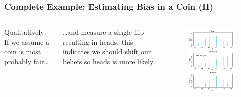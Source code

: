 \documentclass[usenames,dvipsnames,table]{beamer}
\begin{document}
\begin{frame}
\frametitle{Complete Example: Estimating Bias in a Coin (II)}
\begin{columns}[c]
Qualitatively: If we assume a coin is most probably fair\ldots

\vspace{1em}
\ldots and measure a single flip resulting in heads, this indicates we should shift our beliefs so heads is more likely.

\begin{figure}
\centering
\includegraphics[width=\linewidth]{img/fig5_1}
\end{figure}
\end{columns}
\end{frame}
\end{document}
